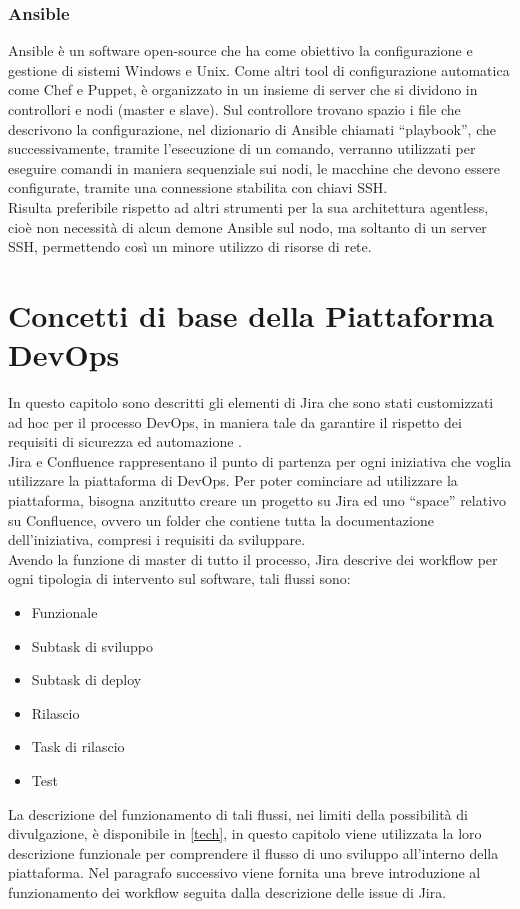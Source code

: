 \documentclass[a4paper, 12pt]{report}
\numberwithin{equation}{section}
\begin{document}
\subsection{Ansible}
Ansible è un software open-source che ha come obiettivo la configurazione e gestione di sistemi Windows e Unix. 
Come altri tool di configurazione automatica come Chef e Puppet, è organizzato in un insieme di server che si dividono in controllori e nodi (master e slave). Sul controllore trovano spazio i file che descrivono la configurazione, nel dizionario di Ansible chiamati “playbook”, che successivamente, tramite l’esecuzione di un comando, verranno utilizzati per eseguire comandi in maniera sequenziale sui nodi, le macchine che devono essere configurate, tramite una connessione stabilita con chiavi SSH.\\
Risulta preferibile rispetto ad altri strumenti per la sua architettura agentless, cioè non necessità di alcun demone Ansible sul nodo, ma soltanto di un server SSH, permettendo così un minore utilizzo di risorse di rete.


\chapter{Concetti di base della Piattaforma DevOps}
In questo capitolo sono descritti gli elementi di Jira che sono stati customizzati ad hoc per il processo DevOps, in maniera tale da garantire il rispetto dei requisiti di sicurezza ed automazione .\\
Jira e Confluence rappresentano il punto di partenza per ogni iniziativa che voglia utilizzare la piattaforma di DevOps. Per poter cominciare ad utilizzare la piattaforma, bisogna anzitutto creare un progetto su Jira ed uno “space” relativo su Confluence, ovvero un folder che contiene tutta la documentazione dell'iniziativa, compresi i requisiti da sviluppare.\\
Avendo la funzione di master di tutto il processo, Jira descrive dei workflow per ogni tipologia di intervento sul software, tali flussi sono:
\begin{itemize}
    \item Funzionale
    \item Subtask di sviluppo
    \item Subtask di deploy
    \item Rilascio
    \item Task di rilascio
    \item Test
\end{itemize}
La descrizione del funzionamento di tali flussi, nei limiti della possibilità di divulgazione, è disponibile in \ref{tech}, in questo capitolo viene utilizzata la loro descrizione funzionale per comprendere il flusso di uno sviluppo all’interno della piattaforma. Nel paragrafo successivo viene fornita una breve introduzione al funzionamento dei workflow seguita dalla descrizione delle issue di Jira.
\end{document}
